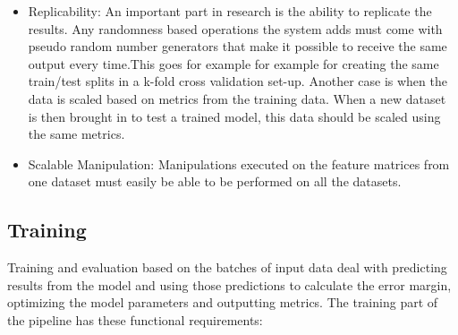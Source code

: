 \begin{itemize}
	\item Replicability: An important part in research is the ability to replicate the results. Any randomness based operations the system adds must come with pseudo random number generators that make it possible to receive the same output every time.This goes for example for example for creating the same train/test splits in a k-fold cross validation set-up. Another case is when the data is scaled based on metrics from the training data. When a new dataset is then brought in to test a trained model, this data should be scaled using the same metrics.
	\item Scalable Manipulation: Manipulations executed on the feature matrices from one dataset must easily be able to be performed on all the datasets.
	
\end{itemize}

\subsection{Training}

Training and evaluation based on the batches of input data deal with predicting results from the model and using those predictions to calculate the error margin, optimizing the model parameters and outputting metrics. The training part of the pipeline has these functional requirements:

